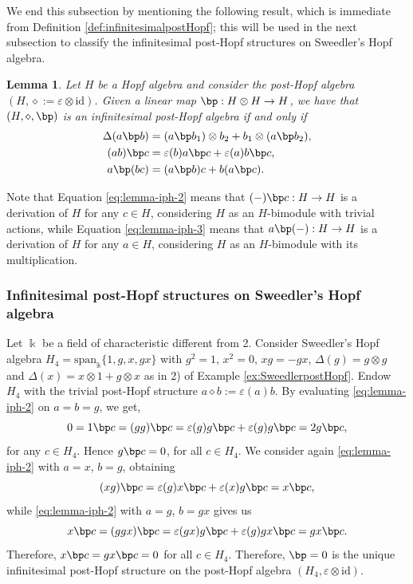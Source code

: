 \documentclass[10pt]{article}
\newtheorem {lemma} {Lemma}
\theoremstyle{definition}
\renewcommand{\wp}{\diamond}
\newcommand{\ot}{\otimes}
\begin{document}
We end this subsection by mentioning the following result, which is immediate from Definition \ref{def:infinitesimalpostHopf}; this will be used in the next subsection to classify the infinitesimal post-Hopf structures on Sweedler's Hopf algebra. 

\begin{lemma}
Let $H$ be a Hopf algebra and consider the post-Hopf algebra $(H,\wp:=\varepsilon\ot\mathrm{id})$. Given a linear map $\bp:H\ot H\to H$, we have that $(H,\wp,\bp)$ is an infinitesimal post-Hopf algebra if and only if
\begin{align}
\Delta(a\bp b)&=(a\bp b_1)\otimes b_2+b_1\otimes(a\bp b_2), \label{eq:lemma-iph-1}\\ 
(ab)\bp c&=\varepsilon(b)a\bp c+\varepsilon(a)b\bp c, \label{eq:lemma-iph-2}\\
a\bp(bc)&=(a\bp b)c+b(a\bp c). \label{eq:lemma-iph-3}
\end{align}
\end{lemma}

Note that Equation \eqref{eq:lemma-iph-2} means that $(-)\bp c:H\to H$ is a derivation of $H$ for any $c\in H$, considering $H$ as an $H$-bimodule with trivial actions, while Equation \eqref{eq:lemma-iph-3} means that $a\bp(-):H\to H$ is a derivation of $H$ for any $a\in H$, considering $H$ as an $H$-bimodule with its multiplication.

\subsubsection{Infinitesimal post-Hopf structures on Sweedler's Hopf algebra}\label{sec:Sweedler}
Let $\Bbbk$ be a field of characteristic different from 2. Consider Sweedler's Hopf algebra $H_4=\mathrm{span}_\Bbbk\{1,g,x,gx\}$ with $g^2=1$, $x^2=0$, $xg=-gx$, $\Delta(g)=g\otimes g$ and $\Delta(x)=x\otimes 1+g\otimes x$ as in 2) of Example \ref{ex:SweedlerpostHopf}. Endow $H_4$ with the trivial post-Hopf structure $a\wp b:=\varepsilon(a)b$. By evaluating \eqref{eq:lemma-iph-2} on $a=b=g$, we get,
\[
0=1\bp c=(gg)\bp c=\varepsilon(g)g\bp c+\varepsilon(g)g\bp c=2g\bp c,
\]
for any $c\in H_{4}$. Hence $g\bp c=0$, for all $c\in H_{4}$. We consider again \eqref{eq:lemma-iph-2} with $a=x$, $b=g$, obtaining
\[
(xg)\bp c=\varepsilon(g)x\bp c+\varepsilon(x)g\bp c=x\bp c, 
\]
while \eqref{eq:lemma-iph-2} with $a=g$, $b=gx$ gives us
\[
x\bp c=(ggx)\bp c=\varepsilon(gx)g\bp c+\varepsilon(g)gx\bp c=gx\bp c.
\]
Therefore, $x\bp c=gx\bp c=0$ for all $c\in H_{4}$. Therefore, $\bp=0$ is the unique infinitesimal post-Hopf structure on the post-Hopf algebra $(H_{4},\varepsilon\ot\mathrm{id})$. \medskip
\end{document}
